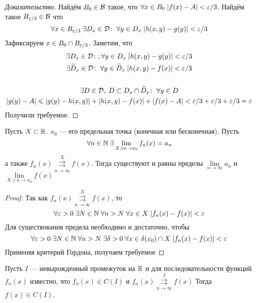 \documentclass[a4paper, 12pt]{article}
\begin{document}
\begin{proof}[Доказательство]
    \par Найдём  $B_0 \in \mathcal{B}$ такое, что $\forall x\in B_0\; |f(x) - A| < \varepsilon/3$. Найдём такое $B_{\varepsilon/3} \in \mathcal{B}$ что 
    $$
        \forall x\in B_{\varepsilon/3}\; \exists D_x\in \mathcal{D}\colon \; \forall y\in D_x\; |h(x,y) - g(y)| < \varepsilon/3 
    $$
    Зафиксируем $x\in B_0\cap B_{\varepsilon/3}$. Заметим, что 
    \begin{gather}
        \exists D_x \in \mathcal{D}\colon;\forall y\in D_x \; |h(x,y) - g(y)| <\varepsilon/3\\
        \exists \widetilde{D}_x\in \mathcal{D}\colon \; \forall y\in \widetilde{D}_x\; |h(x,y) - f(x)| < \varepsilon/3\\
        \ \\
        \exists D\in \mathcal{D},\; D \subset D_x \cap \widetilde{D}_x\colon \; \forall y\in D\\
        |g(y) - A| \leqslant |g(y) - h(x,y)| + |h(x,y) - f(x)| + |f(x) - A| < \varepsilon/3 + \varepsilon/3 + \varepsilon/3 = \varepsilon
    \end{gather}
    Получили требуемое.
\end{proof}
\begin{Theorem}
    Пусть $X\subset \mathbb{R}$. $x_0$ --- его предельная точка (конечная или бесконечная). Пусть 
    $$
        \forall n \in \mathbb{N}\; \exists \lim\limits_{X\owns x \to x_0} f_n(x) = a_n
    $$
    а также $f_n(x)\overset{X}{\underset{n\to\infty}{\rightrightarrows}} f(x)$. Тогда  существуют и равны пределы $\lim\limits_{n \to \infty}a_n$ и $\lim\limits_{X \owns x\to x_0} f(x)$
\end{Theorem}
\begin{proof}
    Так как $f_n(x)\overset{X}{\underset{n\to\infty}{\rightrightarrows}} f(x)$, то
    $$
        \forall \varepsilon >0\; \exists N\in \mathbb{N}\; \forall n>N\; \forall x \in X\; |f_n(x) - f(x)| < \varepsilon
    $$
    Для существования предела необходимо и достаточно, чтобы
    $$
        \forall \varepsilon > 0\; \exists N \in \mathbb{N}\; \forall n>N\; \exists \delta >0\; \forall x\in \delta(x_0)\cap X\; |f_n(x) - f(x)| < \varepsilon
    $$
    Применяя критерий Гордона, получаем требуемое
\end{proof}
\begin{Consequence}
    Пусть $I$ --- невырожденный промежуток на $\mathbb{R}$ и для последовательности функций $f_n(x)$ известно, что $f_n(x) \in C(I)$ и $f_n(x)\overset{I}{\underset{n\to\infty}{\rightrightarrows}} f(x)$
    Тогда $f(x) \in C(I)$.
\end{Consequence}
\end{document}

